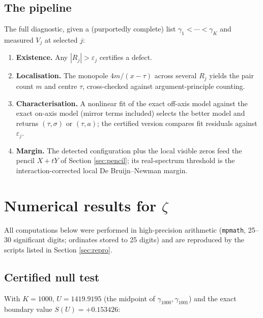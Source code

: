 \documentclass[11pt]{amsart}
\theoremstyle{remark}
\begin{document}
\subsection{The pipeline}\label{sec:pipeline}
The full diagnostic, given a (purportedly complete) list $\gamma_1<\cdots<\gamma_K$ and measured $V_j$ at selected $j$:
\begin{enumerate}
\item \textbf{Existence.} Any $|R_j|>\varepsilon_j$ certifies a defect.
\item \textbf{Localisation.} The monopole $4m/(x-\tau)$ across several $R_j$ yields the pair count $m$ and centre $\tau$, cross-checked against argument-principle counting.
\item \textbf{Characterisation.} A nonlinear fit of the exact off-axis model against the exact on-axis model (mirror terms included) selects the better model and returns $(\tau,\sigma)$ or $(\tau,a)$; the certified version compares fit residuals against $\varepsilon_j$.
\item \textbf{Margin.} The detected configuration plus the local visible zeros feed the pencil $X+tY$ of Section \ref{sec:pencil}; its real-spectrum threshold is the interaction-corrected local De Bruijn--Newman margin.
\end{enumerate}

\section{Numerical results for $\zeta$}\label{sec:numerics}

All computations below were performed in high-precision arithmetic (\texttt{mpmath}, 25--30 significant digits; ordinates stored to 25 digits) and are reproduced by the scripts listed in Section \ref{sec:repro}.

\subsection{Certified null test}
With $K=1000$, $U=1419.9195$ (the midpoint of $\gamma_{1000},\gamma_{1001}$) and the exact boundary value $S(U)=+0.153426$:
\end{document}
